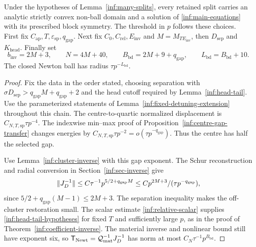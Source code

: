 \begin{proposition}
\label{inf:bounded-assembly}
Under the hypotheses of Lemma~\ref{inf:many-splits}, every retained
split carries an analytic strictly convex non-ball domain and a
solution of \eqref{inf:main-equations} with its prescribed block symmetry.
The threshold in $p$ follows these choices.
First fix $C_{\mathrm{ap}},T,\varepsilon_{\mathrm{sp}},q_{\mathrm{gap}}$.
Next fix $C_0,C_{\mathrm{rel}},E_{\mathrm{inv}}$ and
$M=M_{TE_{\mathrm{inv}}}$, then $D_{\mathrm{sep}}$ and
$K_{\mathrm{head}}$. Finally set
\[
 b_{\mathrm{inv}}=2M+3,\qquad N=4M+40,\qquad
 B_{\mathrm{bd}}=2M+9+q_{\mathrm{gap}},\qquad
 L_{\mathrm{bd}}=B_{\mathrm{bd}}+10.
\]
The closed Newton ball has radius $\tau p^{-L_{\mathrm{bd}}}$.
\end{proposition}
\begin{proof}
Fix the data in the order stated, choosing separation with
$\sigma D_{\mathrm{sep}}>q_{\mathrm{gap}}M+q_{\mathrm{gap}}+2$
and the head cutoff required by Lemma~\ref{inf:head-tail}.
Use the parameterized statements of
Lemma~\ref{inf:fixed-detuning-extension} throughout this chain.
The centre-to-quartic normalized displacement is
$C_{N,T,\mathrm{sp}}\tau p^{-4}$. The indexwise min--max proof of
Proposition~\ref{inf:centre-gap-transfer} changes energies by
$C_{N,T,\mathrm{sp}}\tau p^{-2}=o(\tau p^{-q_{\mathrm{gap}}})$.
Thus the centre has half the selected gap.

Use Lemma~\ref{inf:cluster-inverse} with this gap exponent.
The Schur reconstruction and radial conversion in
Section~\ref{inf:sec-inverse} give
\[
 \lVert J_D^{-1}\rVert\le C\tau^{-1}p^{5/2+q_{\mathrm{gap}}M}
 \le C p^{2M+3}/(\tau p^{-q_{\mathrm{gap}}}),
\]
since $5/2+q_{\mathrm{gap}}(M-1)\le2M+3$.
The separation inequality makes the off-cluster restoration small.
The scalar estimate \eqref{inf:relative-scalar} supplies
\eqref{inf:head-tail-hypotheses} for fixed $T$ and sufficiently
large $p$, as in the proof of Theorem~\ref{inf:coefficient-inverse}.
The material inverse and nonlinear bound still have exponent six,
so $\mathsf T_{\mathrm{Newt}}=\mathcal Q_{\mathrm{mat}}^{-1}J_D^{-1}$ has norm at most
$C_N\tau^{-1}p^{B_{\mathrm{bd}}}$.


\end{proof}
